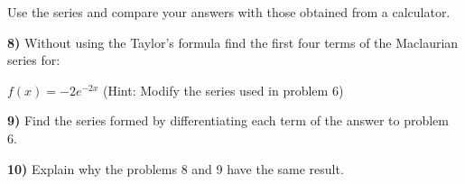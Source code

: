 \documentclass[11pt]{article}
\begin{document}
\hspace*{4mm} Use the series and compare your answers with those obtained from a calculator. \vs


\textbf{8)} Without using the Taylor's formula find the first four terms of the Maclaurian series for:

\hspace*{4mm} $f(x) = -2e^{-2x}$ \hspace*{1cm} (Hint: Modify the series used in problem 6) \vs

\textbf{9)} Find the series formed by differentiating each term of the answer to problem 6. \vs

\textbf{10)} Explain why the problems 8 and 9 have the same result.
\end{document}
